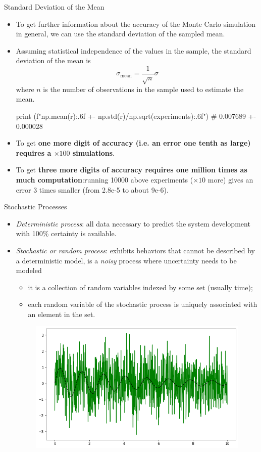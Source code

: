 \documentclass{beamer}
\begin{document}
\begin{frame}[fragile]{Standard Deviation of the Mean}
\begin{itemize}
\item To get further information about the accuracy of the Monte Carlo simulation in general, we can use the standard deviation of the sampled mean. 
\item Assuming statistical independence of the values in the sample, the standard deviation of the mean is 
\begin{equation*}
\sigma _{\text{mean}}={\frac {1}{\sqrt {n}}}\sigma
\end{equation*}
where $n$ is the number of observations in the sample used to estimate the mean. 

\begin{ipython}
print (f"{np.mean(r):.6f} +- {np.std(r)/np.sqrt(experiments):.6f}")
# 0.007689 +- 0.000028
\end{ipython}
\item To get \textbf{one more digit of accuracy (i.e. an error one tenth as large) requires a $\times100$ simulations}.
\item To get \textbf{three more digits of accuracy requires one million times as much computation}:running 10000 above experiments ($\times10$ more) gives an error 3 times smaller (from 2.8e-5 to about 9e-6).
\end{itemize}
\end{frame}

\begin{frame}{Stochastic Processes}
\begin{itemize}
\item \emph{Deterministic process}: all data necessary to predict the system development with 100\% certainty is available.
\item \emph{Stochastic or random process}: exhibits behaviors that cannot be described by a deterministic model, is a \emph{noisy} process where uncertainty needs to be modeled
   \begin{itemize}
    \item it is a collection of random variables indexed by some set (usually time);
    \item each random variable of the stochastic process is uniquely associated with an element in the set. 
    \end{itemize}
\begin{figure}[h]
    \begin{center}
    \includegraphics[width=0.5\linewidth]{stochastic_process}
    \end{center}
\end{figure}        
\end{itemize}
\end{frame}
\end{document}
